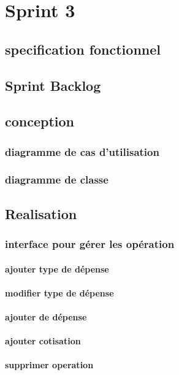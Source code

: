 \section{Sprint 3}
\subsection{specification fonctionnel}
\subsection{Sprint Backlog}
\subsection{conception}
\subsubsection{diagramme de cas d'utilisation}

\subsubsection{diagramme de classe}

\subsection{Realisation}
\subsubsection{interface pour gérer les opération}
\paragraph{ajouter type de dépense}
\paragraph{modifier type de dépense}
\paragraph{ajouter de dépense}
\paragraph{ajouter cotisation}
\paragraph{supprimer operation}


